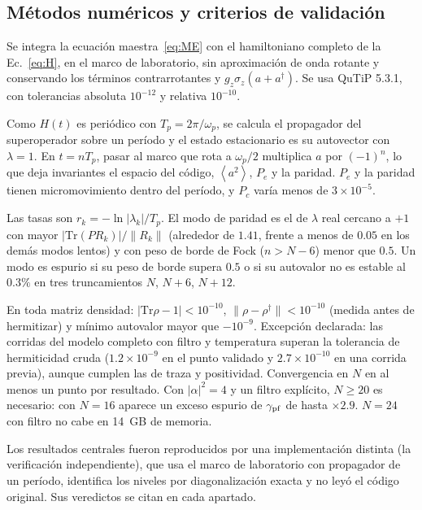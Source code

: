 \documentclass[11pt,a4paper]{article}
\newcommand{\ave}[1]{\left\langle#1\right\rangle}
\theoremstyle{definition}
\begin{document}
\subsection{Métodos numéricos y criterios de validación}
\label{sec:metodos}

Se integra la ecuación maestra~\eqref{eq:ME} con el hamiltoniano completo de la Ec.~\eqref{eq:H}, en el marco de laboratorio, sin aproximación de onda rotante y conservando los términos contrarrotantes y $g_z\sigma_z(a+a^{\dagger})$. Se usa QuTiP 5.3.1, con tolerancias absoluta $10^{-12}$ y relativa $10^{-10}$.

Como $H(t)$ es periódico con $T_p=2\pi/\omega_p$, se calcula el propagador del superoperador sobre un período y el estado estacionario es su autovector con $\lambda=1$. En $t=nT_p$, pasar al marco que rota a $\omega_p/2$ multiplica $a$ por $(-1)^n$, lo que deja invariantes el espacio del código, $\ave{a^2}$, $P_e$ y la paridad. $P_e$ y la paridad tienen micromovimiento dentro del período, y $P_c$ varía menos de $3\times10^{-5}$.

Las tasas son $r_k=-\ln|\lambda_k|/T_p$. El modo de paridad es el de $\lambda$ real cercano a $+1$ con mayor $|\mathrm{Tr}(PR_k)|/\|R_k\|$ (alrededor de $1.41$, frente a menos de $0.05$ en los demás modos lentos) y con peso de borde de Fock ($n>N-6$) menor que $0.5$. Un modo es espurio si su peso de borde supera $0.5$ o si su autovalor no es estable al $0.3\%$ en tres truncamientos $N$, $N+6$, $N+12$.

En toda matriz densidad: $|\mathrm{Tr}\rho-1|<10^{-10}$, $\|\rho-\rho^{\dagger}\|<10^{-10}$ (medida antes de hermitizar) y mínimo autovalor mayor que $-10^{-9}$. Excepción declarada: las corridas del modelo completo con filtro y temperatura superan la tolerancia de hermiticidad cruda ($1.2\times10^{-9}$ en el punto validado y $2.7\times10^{-10}$ en una corrida previa), aunque cumplen las de traza y positividad. Convergencia en $N$ en al menos un punto por resultado. Con $|\alpha|^2=4$ y un filtro explícito, $N\geq20$ es necesario: con $N=16$ aparece un exceso espurio de $\gamma_{\rm pf}$ de hasta $\times2.9$. $N=24$ con filtro no cabe en 14~GB de memoria.

Los resultados centrales fueron reproducidos por una implementación distinta (la verificación independiente), que usa el marco de laboratorio con propagador de un período, identifica los niveles por diagonalización exacta y no leyó el código original. Sus veredictos se citan en cada apartado.

\label{sec:res_Hef}
\end{document}
